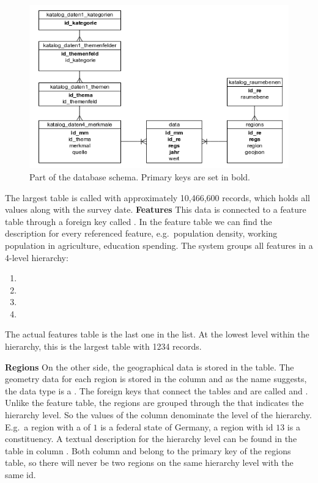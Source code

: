 \begin{figure}[h]
  \centering
  \includegraphics[width=\textwidth]{images/riso}
  \caption{Part of the \riso{} database schema. Primary keys are set in bold.}\label{fig:data:riso}
\end{figure}

The largest table is called  with approximately 10,466,600 records, which holds all values along with the survey date.
\textbf{Features}
This data is connected to a feature table through a foreign key called .
In the feature table we can find the description for every referenced feature, e.g.\ population density, working population in agriculture, education spending.
The \riso{} system groups all features in a 4-level hierarchy:
\begin{enumerate}
  \item
  \item
  \item
  \item
\end{enumerate}
The actual features table is the last one in the list.
At the lowest level within the hierarchy, this is the largest table with 1234 records.


\textbf{Regions}
On the other side, the geographical data is stored in the  table.
The geometry data for each region is stored in the  column and as the name suggests, the data type is a .
The foreign keys that connect the tables  and  are called  and .
Unlike the feature table, the regions are grouped through the  that indicates the hierarchy level.
So the values of the  column denominate the level of the hierarchy.
E.g.\ a region with a  of $1$ is a federal state of Germany, a region with id $13$ is a constituency.
A textual description for the hierarchy level can be found in the  table in column .
Both column  and  belong to the primary key of the regions table, so there will never be two regions on the same hierarchy level with the same  id.

